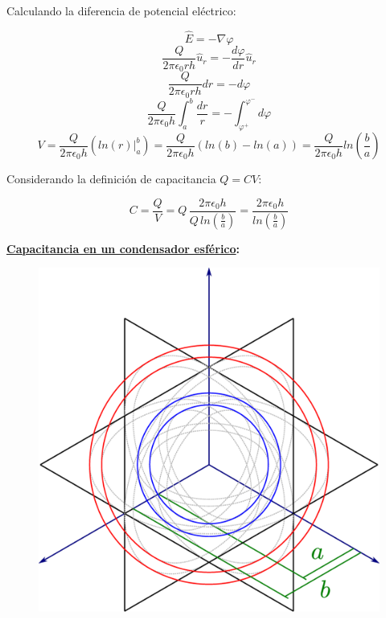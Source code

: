 \documentclass[letter,11pt]{article}
\begin{document}
Calculando la diferencia de potencial eléctrico:

\begin{equation*}
    \hat{E}=-\nabla\varphi
\end{equation*}
\begin{equation*}
    \frac{Q}{2\pi\epsilon_0 r h}\hat{u}_r=-\frac{d\varphi}{dr}\hat{u}_r
\end{equation*}
\begin{equation*}
    \frac{Q}{2\pi\epsilon_0 r h}dr=-d\varphi
\end{equation*}
\begin{equation*}
    \frac{Q}{2\pi\epsilon_0 h}\int_a^b\frac{dr}{r}
    =-\int_{\varphi^+}^{\varphi^-}d\varphi
\end{equation*}
\begin{equation*}
    V=\frac{Q}{2\pi\epsilon_0 h}(ln(r)\Biggr|_a^b)
     =\frac{Q}{2\pi\epsilon_0 h}(ln(b)-ln(a))
     =\frac{Q}{2\pi\epsilon_0 h}ln\left(\frac{b}{a}\right)
\end{equation*}
\vspace{0.5cm}

Considerando la definición de capacitancia $Q=CV$:

\begin{equation*}
    C=\frac{Q}{V}
     =Q\,\frac{2\pi\epsilon_0 h}{Q\,ln(\frac{b}{a})}
     =\frac{2\pi\epsilon_0 h}{ln(\frac{b}{a})}
\end{equation*}
\vspace{0.75cm}

\textbf{\underline{Capacitancia en un condensador esférico}:} \\

\begin{figure}[!h]
\centering
\includegraphics[scale=0.15]{resources/f2.eps}
\end{figure}
\vspace{0.20cm}
\end{document}
